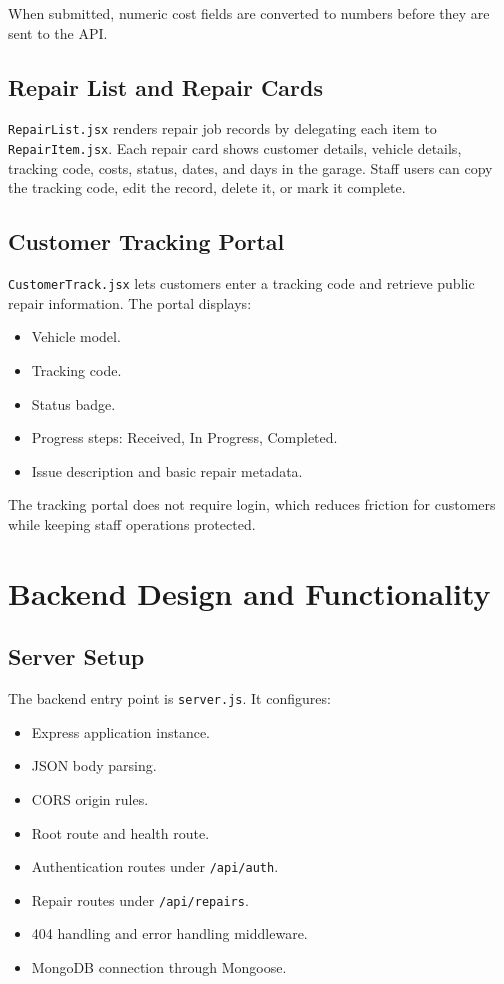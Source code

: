 \documentclass[12pt,a4paper]{report}
\begin{document}
When submitted, numeric cost fields are converted to numbers before they are sent to the API.

\section{Repair List and Repair Cards}

\texttt{RepairList.jsx} renders repair job records by delegating each item to \texttt{RepairItem.jsx}. Each repair card shows customer details, vehicle details, tracking code, costs, status, dates, and days in the garage. Staff users can copy the tracking code, edit the record, delete it, or mark it complete.

\section{Customer Tracking Portal}

\texttt{CustomerTrack.jsx} lets customers enter a tracking code and retrieve public repair information. The portal displays:

\begin{itemize}
  \item Vehicle model.
  \item Tracking code.
  \item Status badge.
  \item Progress steps: Received, In Progress, Completed.
  \item Issue description and basic repair metadata.
\end{itemize}

The tracking portal does not require login, which reduces friction for customers while keeping staff operations protected.

\chapter{Backend Design and Functionality}

\section{Server Setup}

The backend entry point is \texttt{server.js}. It configures:

\begin{itemize}
  \item Express application instance.
  \item JSON body parsing.
  \item CORS origin rules.
  \item Root route and health route.
  \item Authentication routes under \texttt{/api/auth}.
  \item Repair routes under \texttt{/api/repairs}.
  \item 404 handling and error handling middleware.
  \item MongoDB connection through Mongoose.
\end{itemize}
\end{document}
